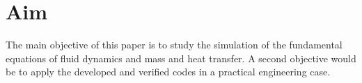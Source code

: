 \section{Aim}
The main objective of this paper is to study the simulation of the fundamental equations of fluid dynamics and mass and heat transfer. A second objective would be to apply the developed and verified codes in a practical engineering case.
